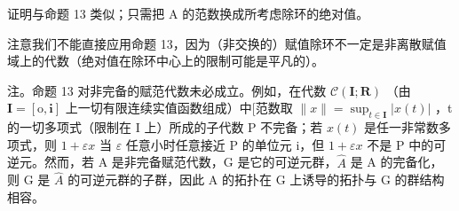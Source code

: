 证明与命题 13 类似；只需把 A 的范数换成所考虑除环的绝对值。

注意我们不能直接应用命题 13，因为（非交换的）赋值除环不一定是非离散赋值域上的代数（绝对值在除环中心上的限制可能是平凡的）。

注。命题 13 对非完备的赋范代数未必成立。例如，在代数 \(\mathcal{C}(\mathbf{I};\mathbf{R})\) （由 \(\mathbf{I} = [\mathrm{o},\mathbf{i}]\) 上一切有限连续实值函数组成）中{[}范数取 \(\| x\| = \sup_{t\in \mathbf{I}}|x(t)|\) ，t 的一切多项式（限制在 I 上）所成的子代数 P 不完备；若 \(x(t)\) 是任一非常数多项式，则 \(1 + \varepsilon x\) 当 \(\varepsilon\) 任意小时任意接近 P 的单位元 i，但 \(1 + \varepsilon x\) 不是 P 中的可逆元。然而，若 A 是非完备赋范代数，G 是它的可逆元群，\(\hat{A}\) 是 A 的完备化，则 G 是 \(\hat{A}\) 的可逆元群的子群，因此 A 的拓扑在 G 上诱导的拓扑与 G 的群结构相容。

